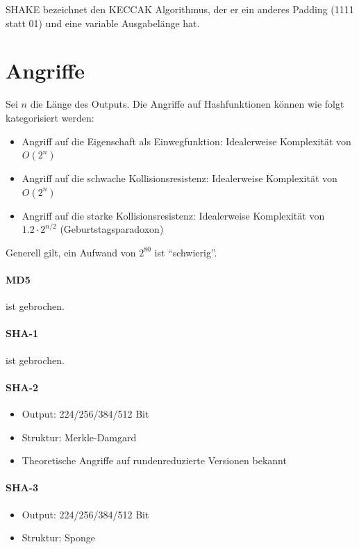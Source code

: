 SHAKE bezeichnet den KECCAK Algorithmus, der er ein anderes Padding (1111 statt 01) und eine variable Ausgabelänge hat.


\section{Angriffe}

Sei $n$ die Länge des Outputs. Die Angriffe auf Hashfunktionen können wie folgt kategorisiert werden:

\begin{itemize}
    \item Angriff auf die Eigenschaft als Einwegfunktion: Idealerweise Komplexität von $O(2^n)$
    \item Angriff auf die schwache Kollisionsresistenz: Idealerweise Komplexität von $O(2^n)$ 
    \item Angriff auf die starke Kollisionsresistenz: Idealerweise Komplexität von $1.2\cdot 2^{n/2}$ (Geburtstagsparadoxon)
\end{itemize}

Generell gilt, ein Aufwand von $2^{80}$ ist ``schwierig''.

\paragraph{MD5} ist gebrochen.
\paragraph{SHA-1} ist gebrochen.
\paragraph{SHA-2} 

\begin{itemize}
    \item Output: 224/256/384/512 Bit
    \item Struktur: Merkle-Damgard
    \item Theoretische Angriffe auf rundenreduzierte Versionen bekannt
\end{itemize}

\paragraph{SHA-3}

\begin{itemize}
    \item Output: 224/256/384/512 Bit
    \item Struktur: Sponge
\end{itemize}

